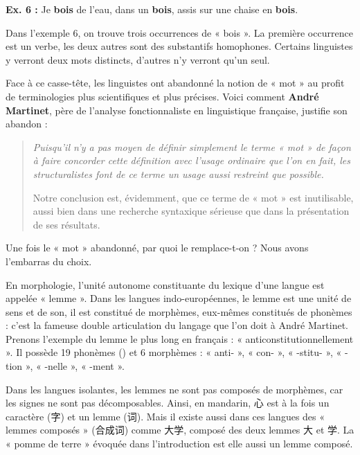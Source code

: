 \noindent\textbf{Ex. 6 :} Je \textbf{bois} de l’eau, dans un \textbf{bois}, assis sur une chaise en \textbf{bois}.

Dans l’exemple 6, on trouve trois occurrences de « bois ». La première occurrence est un verbe, les deux autres sont des substantifs homophones. Certains linguistes y verront deux mots distincts, d’autres n’y verront qu’un seul.

Face à ce casse-tête, les linguistes ont abandonné la notion de « mot » au profit de terminologies plus scientifiques et plus précises. Voici comment \textbf{André Martinet}, père de l’analyse fonctionnaliste en linguistique française, justifie son abandon :
\begin{quote}\small\itshape
Puisqu’il n’y a pas moyen de définir simplement le terme « mot » de façon à faire concorder cette définition avec l’usage ordinaire que l’on en fait, les structuralistes font de ce terme un usage aussi restreint que possible.

Notre conclusion est, évidemment, que ce terme de « mot » est inutilisable, aussi bien dans une recherche syntaxique sérieuse que dans la présentation de ses résultats.
\end{quote}
Une fois le « mot » abandonné, par quoi le remplace-t-on ? Nous avons l’embarras du choix.

En morphologie, l’unité autonome constituante du lexique d’une langue est appelée « lemme ». Dans les langues indo-européennes, le lemme est une unité de sens et de son, il est constitué de morphèmes, eux-mêmes constitués de phonèmes : c’est la fameuse double articulation du langage que l’on doit à André Martinet. Prenons l’exemple du lemme le plus long en français : « anticonstitutionnellement ». Il possède 19 phonèmes () et 6 morphèmes : « anti- », « con- », « -stitu- », « -tion », « -nelle », « -ment ».

Dans les langues isolantes, les lemmes ne sont pas composés de morphèmes, car les signes ne sont pas décomposables. Ainsi, en mandarin, 心 est à la fois un caractère (字) et un lemme (词). Mais il existe aussi dans ces langues des « lemmes composés » (合成词) comme 大学, composé des deux lemmes 大 et 学. La « pomme de terre » évoquée dans l’introduction est elle aussi un lemme composé.

